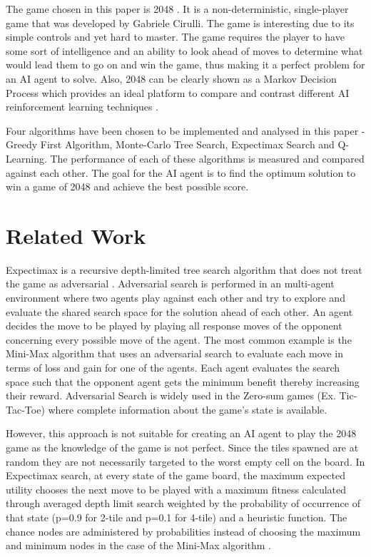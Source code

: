 \documentclass{svproc}
\begin{document}

The game chosen in this paper is 2048 \cite{2048}. It is a non-deterministic, single-player game that was developed by Gabriele Cirulli. The game is interesting due to its simple controls and yet hard to master. The game requires the player to have some sort of intelligence and an ability to look ahead of moves to determine what would lead them to go on and win the game, thus making it a perfect problem for an AI agent to solve. Also, 2048 can be clearly shown as a Markov Decision Process which provides an ideal platform to compare and contrast different AI reinforcement learning techniques \cite{jaskowski, pedagogy}.

Four algorithms have been chosen to be implemented and analysed in this paper - Greedy First Algorithm, Monte-Carlo Tree Search, Expectimax Search and Q-Learning. The performance of each of these algorithms is measured and compared against each other. The goal for the AI agent is to find the optimum solution to win a game of 2048 and achieve the best possible score.

    \section{Related Work}

    Expectimax is a recursive depth-limited tree search algorithm that does not treat the game as adversarial \cite{Maryam}. Adversarial search is performed in an multi-agent environment where two agents play against each other and try to explore and evaluate the shared search space for the solution ahead of each other. An agent decides the move to be played by playing all response moves of the opponent concerning every possible move of the agent. The most common example is the Mini-Max algorithm \cite{7162574, Dan} that uses an adversarial search to evaluate each move in terms of loss and gain for one of the agents. Each agent evaluates the search space such that the opponent agent gets the minimum benefit thereby increasing their reward. Adversarial Search is widely used in the Zero-sum games (Ex. Tic-Tac-Toe) where complete information about the game’s state is available. 
    
    However, this approach is not suitable for creating an AI agent to play the 2048 game as the knowledge of the game is not perfect. Since the tiles spawned are at random they are not necessarily targeted to the worst empty cell on the board. In Expectimax search, at every state of the game board, the maximum expected utility \cite{Maryam} chooses the next move to be played with a maximum fitness calculated through averaged depth limit search weighted by the probability of occurrence of that state (p=0.9 for 2-tile and p=0.1 for 4-tile) and a heuristic function. The chance nodes are administered by probabilities instead of choosing the maximum and minimum nodes in the case of the Mini-Max algorithm \cite{7162574}.
   
\end{document}
